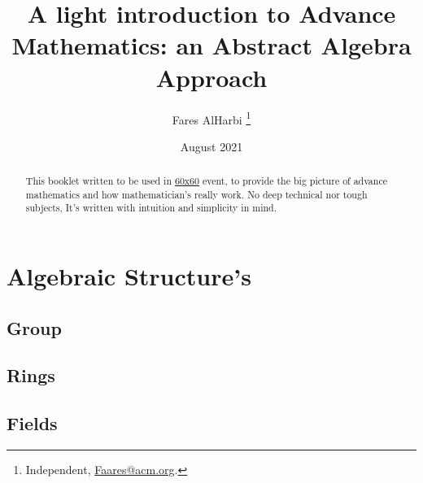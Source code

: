 \documentclass{article}
\title{A light introduction to Advance Mathematics: an Abstract Algebra Approach}
\author{Fares AlHarbi \thanks{Independent, \href{mailto:faares@acm.org}{Faares@acm.org}.}}
\date{August 2021}
\begin{document}
\maketitle
\begin{abstract}
    This booklet written to be used in \hyperlink{https://salla.sa/durba/RYePmz}{60x60} event,
    to provide the big picture of advance mathematics and how mathematician's really work.
    No deep technical nor tough subjects, It's written with intuition and simplicity in mind. 
\end{abstract}

\clearpage
\tableofcontents 






\clearpage

\clearpage

\clearpage

\clearpage
\section{Algebraic Structure's}

\subsection{Group}

\subsection{Rings}

\subsection{Fields}

\clearpage
\printbibliography[heading=bibintoc]
\end{document}
